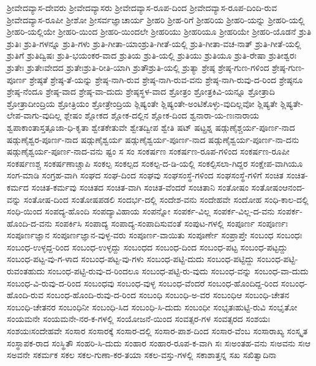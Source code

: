{ಶ್ರೀವೇದವ್ಯಾಸ-ದೇವರು
ಶ್ರೀವೇದವ್ಯಾಸರು
ಶ್ರೀವೇದವ್ಯಾಸ-ರೂಪ-ದಿಂದ
ಶ್ರೀವೇದವ್ಯಾಸ-ರೂಪ-ದಿಂದಿ-ರುವ
ಶ್ರೀವೇದವ್ಯಾಸ-ರೂಪೀ
ಶ್ರೀಶೋ
ಶ್ರೀಸರ್ವಜ್ಞಾಚಾರ್ಯ
ಶ್ರೀಹರಿ
ಶ್ರೀಹ-ರಿಗೆ
ಶ್ರೀಹರಿಯ
ಶ್ರೀಹರಿ-ಯನ್ನು
ಶ್ರೀಹರಿ-ಯಲ್ಲಿ
ಶ್ರೀಹರಿ-ಯಲ್ಲಿಯೇ
ಶ್ರೀಹರಿ-ಯಿಂದ
ಶ್ರೀಹರಿ-ಯಿಂದಲೇ
ಶ್ರೀಹರಿಯು
ಶ್ರೀಹರಿಯೂ
ಶ್ರೀಹರಿಯೇ
ಶ್ರೀಹರಿ-ಯೊಡನೆ
ಶ್ರುತಿ
ಶ್ರುತಿಃ
ಶ್ರುತಿ-ಗಳನ್ನೂ
ಶ್ರುತಿ-ಗಳು
ಶ್ರುತಿ-ಗೀತಾ-ಯಾಂಶ್ರುತಿ-ಗೀತೆ-ಯಲ್ಲಿ
ಶ್ರುತಿ-ಗೀತಾ-ವಚ-ನಾತ್
ಶ್ರುತಿ-ಗೀತೆ-ಯಲ್ಲಿ
ಶ್ರುತಿಗೆ
ಶ್ರುತಿದ್ವಿಷಃ
ಶ್ರುತಿ-ಭಯಂಕರ-ವಾದ
ಶ್ರುತಿಯ
ಶ್ರುತಿ-ಯಲ್ಲಿ
ಶ್ರುತಿಯು
ಶ್ರುತಿಯೂ
ಶ್ರುತಿ-ರೇಷಾ
ಶ್ರುತೀಶ್ವರಃ
ಶ್ರುತೇಃ
ಶ್ರುತೇಃವೇದದ
ಶ್ರುತೇಃಶ್ರುತಿ-ರೀತಿ-ಯಾಗಿ
ಶ್ರುತೌಶ್ರುತಿ-ಯಲ್ಲಿ
ಶ್ರುತ್ಯಾ
ಶ್ರೇಷ್ಠ
ಶ್ರೇಷ್ಠ-ಗುಣ-ಗಳಿಂದ
ಶ್ರೇಷ್ಠ-ಗುಣ-ಪೂರ್ಣ
ಶ್ರೇಷ್ಠತೆ
ಶ್ರೇಷ್ಠ-ತೆ-ಯನ್ನು
ಶ್ರೇಷ್ಠ-ನಾಗಿ-ರುವ
ಶ್ರೇಷ್ಠ-ನಾಗಿ-ರುವ-ವನು
ಶ್ರೇಷ್ಠ-ನಾಗಿ-ರುವು-ದ-ರಿಂದ
ಶ್ರೇಷ್ಠನೂ
ಶ್ರೇಷ್ಠ-ನೆಂದೂ
ಶ್ರೇಷ್ಠ-ವಾದ
ಶ್ರೇಷ್ಠ-ವಾ-ದುದು
ಶ್ರೇಷ್ಠಸ್ಥಳ-ವಾದ
ಶ್ರೋತ್ರಂ
ಶ್ರೋತ್ರಕಿವಿ-ಯನ್ನೂ
ಶ್ರೋತ್ರಾದಿ
ಶ್ರೋತ್ರಾದೀಂದ್ರಿಯ
ಶ್ರೋತ್ರಿಯಂ
ಶ್ರೋತ್ರೇಂದ್ರಿಯ
ಶ್ಲಿಷ್ಯಂತೇ
ಶ್ಲಿಷ್ಯಂತೇ-ಅಂಟಿಕೊಳ್ಳು-ವುದಿಲ್ಲವೋ
ಶ್ಲಿಷ್ಯತೇ
ಶ್ಲಿಷ್ಯತೇ-ಲೇಪ-ವಾಗು-ವುದಿಲ್ಲ
ಶ್ಲೇಷಂ
ಶ್ಲೋಕದ
ಶ್ಲೋಕ-ದಲ್ಲಿನ
ಶ್ಲೋಕ-ದಿಂದ
ಶ್ವನಾರಾ-ಯ-ಣಃನಾರಾಯ
ಶ್ವಪಾಕಾಂತಾಸ್ತತ್ಪೂಜಾ-ಧಿ-ಕೃತಾ
ಶ್ವೇತಕೇತುವೇ
ಶ್ವೇತದ್ವೀಪ
ಶ್ವೇತಿ
ಷಟ್
ಷಟ್ಪ್ರಶ್ನ
ಷಡ್ಗುಣೈಶ್ಚರ್ಯ-ಪೂರ್ಣ-ನಾದ
ಷಡ್ಗುಣೈಶ್ವರ-ಪೂರ್ಣ-ನಾದ
ಷಡ್ಗುಣೈಶ್ವರ್ಯ
ಷಡ್ಗುಣೈಶ್ವರ್ಯ-ಪೂರ್ಣ-ನಾದ
ಷಡ್ಗುಣೈಶ್ವರ್ಯ-ಪೂರ್ಣ-ನಾ-ದನು
ಷಡ್ಗುಣೈಶ್ವರ್ಯ-ಪೂರ್ಣ-ನಾದ-ವನು
ಷ್ಟಂ
ಸ
ಸಂ
ಸಂಕರ್ಷಣ
ಸಂಕರ್ಷಣ-ರೂಪ-ಗಳಿಂದ
ಸಂಕರ್ಷಣ-ರೂಪೀ
ಸಂಕರ್ಷಣಶ್ಚ
ಸಂಕರ್ಷಣಾಚ್ಚಾಪಿ
ಸಂಕಲ್ಪ
ಸಂಕಲ್ಪದ
ಸಂಕಲ್ಪ-ದ-ಡಿ-ಯಲ್ಲಿ
ಸಂಕಲ್ಪಿಸಲಾ-ಗಿದ್ದರ
ಸಂಕ್ಷೇಪ-ವಾಗಿಯೂ
ಸಂಗ-ಮಾಡಿ
ಸಂಗ್ರಹ-ವಾಗಿ
ಸಂಘದ
ಸಂಘ-ದಿಂದ
ಸಂಘವು
ಸಂಘಸಂಸ್ಥೆ-ಗಳಿಂದ
ಸಂಘಸಂಸ್ಥೆ-ಗಳಿಗೆ
ಸಂಚಿತ
ಸಂಚಿತ-ಕರ್ಮದ
ಸಂಚಿತ-ಕರ್ಮವು
ಸಂಚಿತದ
ಸಂಚಿತ-ವಾಗಿ
ಸಂಚಿತ-ವೆಂದರೆ
ಸಂಚಿತಾನಿ
ಸಂತೋಷಂ
ಸಂತೋಷಂಆನಂದ-ವನ್ನು
ಸಂತೋಷ-ದಿಂದ
ಸಂತೋಷಪಡಲಿ
ಸಂದರ್ಭ-ದಲ್ಲಿ
ಸಂದೇಶ-ವನು
ಸಂದೇಹವೇ
ಸಂದೋಹ
ಸಂಧಿ-ಕಾಲ-ದಲ್ಲಿ
ಸಂಧಿ-ಯಿಂದ
ಸಂಪದ್ಯ-ಹೊಂದಿ
ಸಂಪದ್ಯಾವಿಹಾಯ
ಸಂಪನ್ನೋ
ಸಂಪರ್ಕ-ವಿಲ್ಲ
ಸಂಪರ್ಕ-ವಿಲ್ಲ-ದ-ವನು
ಸಂಪರ್ಕ-ಹೊಂದಿ-ದ-ವನು
ಸಂಪರ್ಕಿಸಿ
ಸಂಪಾದ್ಯ
ಸಂಪಾದ್ಯ-ಸಂಪಾದಿಸುವಂತೆ
ಸಂಪುಟ-ಗಳಲ್ಲಿ
ಸಂಪೂರ್ಣ
ಸಂಪೂರ್ಣಃ
ಸಂಪೂರ್ಣಜ್ಞಾನ
ಸಂಪೂರ್ಣಜ್ಞಾನ-ವುಳ್ಳ-ವರು
ಸಂಪೂರ್ಣ-ವಾಯಿತು
ಸಂಪೂರ್ಣೇ
ಸಂಪ್ರಾಪ್ತೇ
ಸಂಬಂಧ
ಸಂಬಂಧಃ
ಸಂಬಂಧ-ಉಳ್ಳದ್ದ-ರಿಂದ
ಸಂಬಂಧ-ಉಳ್ಳದ್ದು
ಸಂಬಂಧದ
ಸಂಬಂಧ-ದಿಂದ
ಸಂಬಂಧ-ಪಟ್ಟ
ಸಂಬಂಧ-ಪಟ್ಟದ್ದು
ಸಂಬಂಧ-ಪಟ್ಟ-ವು-ಗ-ಳಾದ
ಸಂಬಂಧ-ಪಟ್ಟ-ವು-ಗಳು
ಸಂಬಂಧ-ಪಟ್ಟಿ-ದುದು
ಸಂಬಂಧ-ಪಟ್ಟಿದ್ದು
ಸಂಬಂಧ-ಪಟ್ಟಿ-ರುವಂತಹುದು
ಸಂಬಂಧ-ಪಟ್ಟಿ-ರುವು-ದ-ರಿಂದಲೂ
ಸಂಬಂಧ-ಪಟ್ಟಿ-ರು-ವುದು
ಸಂಬಂಧ-ವನ್ನು
ಸಂಬಂಧ-ವಾ-ದುದು
ಸಂಬಂಧ-ವಿ-ರುವು-ದ-ರಿಂದ
ಸಂಬಂಧವು
ಸಂಬಂಧ-ವುಳ್ಳ
ಸಂಬಂಧ-ವೆಂದರೆ
ಸಂಬಂಧ-ಹೊಂದಿದ್ದ-ರಿಂದ
ಸಂಬಂಧ-ಹೊಂದಿ-ರುವ
ಸಂಬಂಧ-ಹೊಂದಿ-ರುವು-ದ-ರಿಂದ
ಸಂಬಂಧಿ
ಸಂಬಂಧಿ-ಅ-ವರ
ಸಂಬಂಧಿಆ
ಸಂಬಂಧಿ-ಚೇತನ
ಸಂಬಂಧಿ-ಚೇತನರ
ಸಂಬಂಧಿನೀ
ಸಂಬಂಧಿ-ಸಿದ
ಸಂಬಂಧಿ-ಸಿ-ದುದು
ಸಂಬಂಧೀ
ಸಂಭೃತಃಹುಟ್ಟಿ-ರುವಿ
ಸಂಭೃತೋ
ಸಂಯಮನೇ
ಸಂಯಮನೇ-ನರ-ಕ-ಗಳಲ್ಲಿ
ಸಂಯೋಜನೆ-ಯಿಂದ
ಸಂವತ್ಸರ-ಗಳ
ಸಂವತ್ಸರದ
ಸಂಶಯಃ
ಸಂಶಯಃಸಂದೇಹವೇ
ಸಂಸಾರ
ಸಂಸಾರಕ್ಕೆ
ಸಂಸಾರ-ದಲ್ಲಿ
ಸಂಸಾರ-ಪಾಶ-ದಿಂದ
ಸಂಸಾರ-ವೆಂಬ
ಸಂಸಾರಾಖ್ಯ
ಸಂಸ್ಕೃತ
ಸಂಸ್ಥಾಪಕ-ರಾದ
ಸಂಸ್ಥಿತೌ
ಸಂಹರಿ-ಸಿ-ದುದು
ಸಂಹಾರ
ಸಂಹಾರ-ರೂಪ-ಕ-ವಾಗಿ
ಸಃ
ಸಃಅಂತಹ-ವನು
ಸಃಅವನು
ಸಃಆ
ಸಅವನೇ
ಸಕರ್ಮಕ
ಸಕಲ
ಸಕಲ-ಗುಣಾ-ಕರ-ತಯಾ
ಸಕಲ-ವಸ್ತು-ಗಳಲ್ಲಿ
ಸಕಾಶಾತ್ತನ್ನ
ಸಖ
ಸಖಿತ್ವಾದಿನಾ
}
